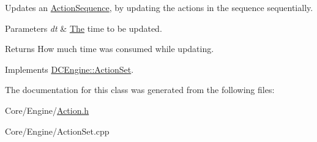 Updates an \hyperlink{classDCEngine_1_1ActionSequence}{Action\-Sequence}, by updating the actions in the sequence sequentially. 


\begin{DoxyParams}{Parameters}
{\em dt} & \hyperlink{classThe}{The} time to be updated. \\
\hline
\end{DoxyParams}
\begin{DoxyReturn}{Returns}
How much time was consumed while updating. 
\end{DoxyReturn}


Implements \hyperlink{classDCEngine_1_1ActionSet}{D\-C\-Engine\-::\-Action\-Set}.



The documentation for this class was generated from the following files\-:\begin{DoxyCompactItemize}
\item 
Core/\-Engine/\hyperlink{Action_8h}{Action.\-h}\item 
Core/\-Engine/Action\-Set.\-cpp\end{DoxyCompactItemize}
